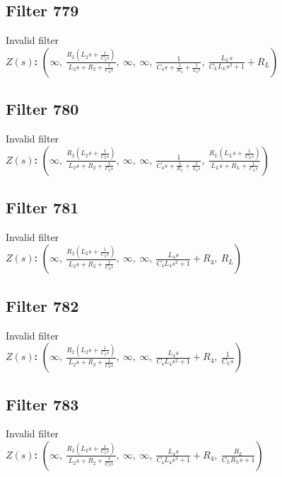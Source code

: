 \documentclass{article}
\begin{document}
\subsection*{Filter 779}
Invalid filter \\ 
\textbf{$Z(s)$:} $\left( \infty, \  \frac{R_{2} \left(L_{2} s + \frac{1}{C_{2} s}\right)}{L_{2} s + R_{2} + \frac{1}{C_{2} s}}, \  \infty, \  \infty, \  \frac{1}{C_{4} s + \frac{1}{R_{4}} + \frac{1}{L_{4} s}}, \  \frac{L_{L} s}{C_{L} L_{L} s^{2} + 1} + R_{L}\right)$ \\ 
\subsection*{Filter 780}
Invalid filter \\ 
\textbf{$Z(s)$:} $\left( \infty, \  \frac{R_{2} \left(L_{2} s + \frac{1}{C_{2} s}\right)}{L_{2} s + R_{2} + \frac{1}{C_{2} s}}, \  \infty, \  \infty, \  \frac{1}{C_{4} s + \frac{1}{R_{4}} + \frac{1}{L_{4} s}}, \  \frac{R_{L} \left(L_{L} s + \frac{1}{C_{L} s}\right)}{L_{L} s + R_{L} + \frac{1}{C_{L} s}}\right)$ \\ 
\subsection*{Filter 781}
Invalid filter \\ 
\textbf{$Z(s)$:} $\left( \infty, \  \frac{R_{2} \left(L_{2} s + \frac{1}{C_{2} s}\right)}{L_{2} s + R_{2} + \frac{1}{C_{2} s}}, \  \infty, \  \infty, \  \frac{L_{4} s}{C_{4} L_{4} s^{2} + 1} + R_{4}, \  R_{L}\right)$ \\ 
\subsection*{Filter 782}
Invalid filter \\ 
\textbf{$Z(s)$:} $\left( \infty, \  \frac{R_{2} \left(L_{2} s + \frac{1}{C_{2} s}\right)}{L_{2} s + R_{2} + \frac{1}{C_{2} s}}, \  \infty, \  \infty, \  \frac{L_{4} s}{C_{4} L_{4} s^{2} + 1} + R_{4}, \  \frac{1}{C_{L} s}\right)$ \\ 
\subsection*{Filter 783}
Invalid filter \\ 
\textbf{$Z(s)$:} $\left( \infty, \  \frac{R_{2} \left(L_{2} s + \frac{1}{C_{2} s}\right)}{L_{2} s + R_{2} + \frac{1}{C_{2} s}}, \  \infty, \  \infty, \  \frac{L_{4} s}{C_{4} L_{4} s^{2} + 1} + R_{4}, \  \frac{R_{L}}{C_{L} R_{L} s + 1}\right)$ \\ 
\end{document}
